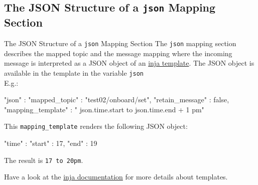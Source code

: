 ﻿\subsection{The JSON Structure of a \texttt{json} Mapping Section}

\begin{frame}[fragile]{The JSON Structure of a \texttt{json} Mapping Section}
  The \textcolor{fh-ooe-red}{\texttt{json}} mapping section describes the \textcolor{fh-ooe-red}{mapped topic} and the \textcolor{fh-ooe-red}{message mapping} where the \textcolor{fh-ooe-red}{incoming message} is \textcolor{fh-ooe-red}{interpreted as a JSON object} of an \textcolor{fh-ooe-red}{\href{https://github.com/pantor/inja/tree/master}{inja template}}. The \textcolor{fh-ooe-red}{JSON object} is available in the template in the variable \texttt{\textcolor{fh-ooe-red}{json}}\\E.g.:

  \begin{jsoncode}[gobble=4]
    "json" : {
        "mapped_topic" : "test02/onboard/set",
        "retain_message" : false,
        "mapping_template" : "{{ json.time.start }} to {{ json.time.end + 1 }}pm"
    }
  \end{jsoncode}
  This \texttt{\textcolor{fh-ooe-red}{mapping\_template}} renders the following JSON object:

  \begin{jsoncode}[gobble=4]
    {
        "time" : {
            "start" : 17,
            "end" : 19
        }
    }
  \end{jsoncode}
  The result is \texttt{\textcolor{fh-ooe-red}{17 to 20pm}}.

  Have a look at the \textcolor{fh-ooe-red}{\href{https://github.com/pantor/inja/tree/master}{inja documentation}} for more details about templates.
\end{frame}

